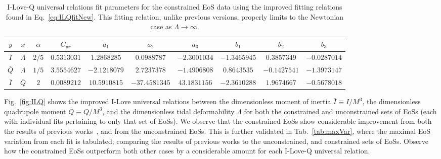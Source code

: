 \documentclass[prd,twocolumn,nofootinbib,superscriptaddress,amsmath,amssymb]{revtex4-1}
\begin{document}
\begin{table*}
\centering
\caption{
I-Love-Q universal relations fit parameters for the constrained EoS data using the improved fitting relations found in Eq.~\ref{eq:ILQfitNew}.
This fitting relation, unlike previous versions, properly limits to the Newtonian case as $\Lambda \rightarrow \infty$.
}\label{tab:ILQfitNew}
\begin{tabular}{ c  c  | c c c c c c c c} 
 \hline
 \hline
 $y$ & $x$ & $\alpha$ & $C_{yx}$ & $a_1$ & $a_2$ & $a_3$ & $b_1$ & $b_2$ & $b_3$ \\
 \hline
 $\bar{I}$ & $\Lambda$ & $2/5$ & $0.5313031$ & $1.2868285$ & $0.0988787$ & $-2.3001034$ & $-1.3465945$ & $0.3857349$ & $-0.0287014$\\
 $\bar{Q}$ & $\Lambda$ & $1/5$ & $3.5554627$ & $-2.1218079$ & $2.7237378$ & $-1.4906808$ & $0.8643535$ & $-0.1427541$ & $-1.3973147$\\
 $\bar{I}$ & $\bar{Q}$ & $2$ & $0.0089212$ & $10.5910815$ & $-37.4581345$ & $43.1831156$ & $-2.3610288$ & $1.9674667$ & $-0.5678018$\\
\hline
\hline
\end{tabular}
\end{table*}

Fig.~\ref{fig:ILQ} shows the improved I-Love universal relations between the dimensionless moment of inertia $\bar{I} \equiv I/M^3$, the dimensionless quadrupole moment $\bar{Q} \equiv Q/M^3$, and the dimensionless tidal deformability $\Lambda$ for both the constrained and unconstrained sets of EoSs (each with individual fits pertaining to only that set of EoSs).
We observe that the constrained EoSs show considerable improvement from both the results of previous works~\cite{Yagi:ILQ}, and from the unconstrained EoSs.
This is further validated in Tab.~\ref{tab:maxVar}, where the maximal EoS variation from each fit is tabulated; comparing the results of previous works to the unconstrained, and constrained sets of EoSs.
Observe how the constrained EoSs outperform both other cases by a considerable amount for each I-Love-Q universal relation.
\end{document}
